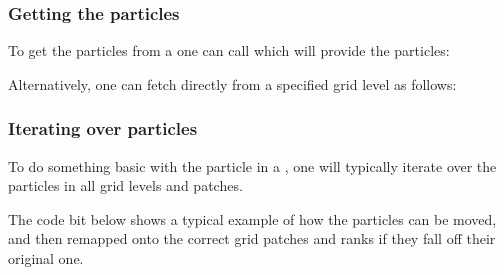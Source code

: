 \documentclass[letterpaper,10pt,english]{sphinxmanual}
\begin{document}
\subsubsection{Getting the particles}
\label{\detokenize{Source/Particles:getting-the-particles}}
To get the particles from a  one can call  which will provide the particles:

\begin{sphinxVerbatim}[commandchars=\\\{\},formatcom=\scriptsize]
 

   
\end{sphinxVerbatim}

Alternatively, one can fetch directly from a specified grid level as follows:

\begin{sphinxVerbatim}[commandchars=\\\{\},formatcom=\scriptsize]
 
 

   \PYG{p}{[}\PYG{p}{]}
\end{sphinxVerbatim}


\subsubsection{Iterating over particles}
\label{\detokenize{Source/Particles:iterating-over-particles}}
To do something basic with the particle in a , one will typically iterate over the particles in all grid levels and patches.

The code bit below shows a typical example of how the particles can be moved, and then remapped onto the correct grid patches and ranks if they fall off their original one.
\end{document}
